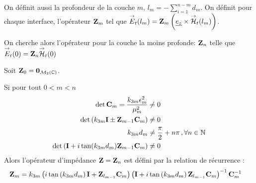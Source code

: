         On définit aussi la profondeur de la couche $m$, $l_m = -\sum_{i=1}^{n-m} d_{m} $. 
        On définit pour chaque interface, l'opérateur $\mathbf{Z}_m$ tel que ${\overset{\rightarrow}{E}}_t(l_m) = \mathbf{Z}_m \left(\underline{e_z} \times {\overset{\rightarrow}{\mathcal{H}}}_t(l_m)\right)$. 

        On cherche alors l'opérateur pour la couche la moins profonde: $\mathbf{Z}_n$ telle que ${\overset{\rightarrow}{E}}_t(0) = \mathbf{Z}_n{\overset{\rightarrow}{\mathcal{H}}}_t(0)$

        \begin{thm}
            Soit $\mathbf{Z}_0 = \mathbf{0}_{\mathcal{M}_2(\mathbb C)}$.

            Si pour tout $0<m < n$
                \begin{align}
                \det{\mathbf{C}_m} = \dfrac{k_{3m}\epsilon_m^2}{\mu_m^2} &\not = 0 \\
                \det\left(k_{3m}\mathbf{I} \pm \mathbf{Z}_{m-1}\mathbf{C}_m \right) &\not = 0 \\
                k_{3m}d_m &\not = \dfrac{\pi}{2}+n\pi\,, \forall n \in \mathbb N \\
                \det\left(\mathbf{I} + i\tan(k_{3m}d_m)\mathbf{Z}_{m-1}\mathbf{C}_m\right) &\not = 0
            \end{align}
            Alors l'opérateur d'impédance $\mathbf{Z} =  \mathbf{Z}_n$ est défini par la relation de récurrence : 
            \begin{align}
            \mathbf{Z}_m &= k_{3m}
            \left(i\tan\left(k_{3m}d_m\right)\mathbf{I} + \mathbf{Z}_{l_{m-1}}\mathbf{C}_m\right)
            \left(\mathbf{I} + i\tan\left(k_{3m}d_m\right)\mathbf{Z}_{l_{m-1}}\mathbf{C}_m\right)^{-1}
            \mathbf{C}_m^{-1}
            \end{align}
        \end{thm}

